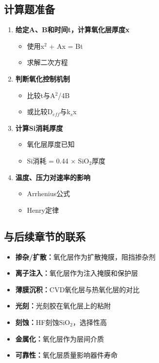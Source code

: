 \documentclass[UTF8,12pt,a4paper]{ctexart}
\begin{document}
\subsection{计算题准备}

\begin{enumerate}
    \item \textbf{给定A、B和时间t，计算氧化层厚度x}
    \begin{itemize}
        \item 使用x$^2$ + Ax = Bt
        \item 求解二次方程
    \end{itemize}
    
    \item \textbf{判断氧化控制机制}
    \begin{itemize}
        \item 比较t与A$^2$/4B
        \item 或比较D$_{eff}$与k$_s$x
    \end{itemize}
    
    \item \textbf{计算Si消耗厚度}
    \begin{itemize}
        \item 氧化层厚度已知
        \item Si消耗 = 0.44 $\times$ SiO$_2$厚度
    \end{itemize}
    
    \item \textbf{温度、压力对速率的影响}
    \begin{itemize}
        \item Arrhenius公式
        \item Henry定律
    \end{itemize}
\end{enumerate}

\subsection{与后续章节的联系}

\begin{itemize}
    \item \textbf{掺杂/扩散：}氧化层作为扩散掩膜，阻挡掺杂剂
    \item \textbf{离子注入：}氧化层作为注入掩膜和保护层
    \item \textbf{薄膜沉积：}CVD氧化层与热氧化层的对比
    \item \textbf{光刻：}光刻胶在氧化层上的粘附
    \item \textbf{刻蚀：}HF刻蚀SiO$_2$，选择性高
    \item \textbf{金属化：}氧化层作为层间介质
    \item \textbf{可靠性：}氧化层质量影响器件寿命
\end{itemize}
\end{document}
